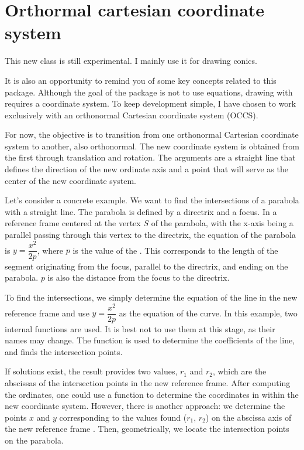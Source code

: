 \newpage
\section{Orthormal cartesian coordinate system} %
\label{sec:orthormal_cartesian_coordinate_system}

This new class is still experimental. I mainly use it for drawing conics.

It is also an opportunity to remind you of some key concepts related to this package. Although the goal of the package is not to use equations, drawing with \TIKZ{} requires a coordinate system. To keep development simple, I have chosen to work exclusively with an orthonormal Cartesian coordinate system (OCCS).

For now, the objective is to transition from one orthonormal Cartesian coordinate system to another, also orthonormal. The new coordinate system is obtained from the first through translation and rotation. The arguments are a straight line that defines the direction of the new ordinate axis and a point that will serve as the center of the new coordinate system.

Let's consider a concrete example. We want to find the intersections of a parabola with a straight line. The parabola is defined by a directrix and a focus. In a reference frame centered at the vertex $S$ of the parabola, with the x-axis being a parallel passing through this vertex to the directrix, the equation of the parabola is $y =\dfrac{x^2}{2p}$, where $p$ is the value of the . This corresponds to the length of the segment originating from the focus, parallel to the directrix, and ending on the parabola. $p$ is also the distance from the focus to the directrix.

To find the intersections, we simply determine the equation of the line in the new reference frame and use $y =\dfrac{x^2}{2p}$ as the equation of the curve. In this example, two internal functions are used. It is best not to use them at this stage, as their names may change. The function  is used to determine the coefficients of the line, and  finds the intersection points.

If solutions exist, the result provides two values, $r_1$ and $r_2$, which are the abscissas of the intersection points in the new reference frame. After computing the ordinates, one could use a function to determine the coordinates in \TIKZ{} within the new coordinate system. However, there is another approach: we determine the points $x$ and $y$ corresponding to the values found ($r_1$, $r_2$) on the abscissa axis of the new reference frame . Then, geometrically, we locate the intersection points on the parabola.

